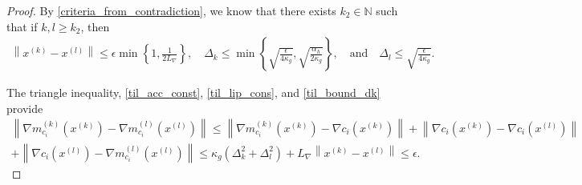 \documentclass{article}
\theoremstyle{case}
\numberwithin{theorem}{subsection}
\newcommand{\dk}{\Delta_k}
\newcommand{\dl}{\Delta_l}
\newcommand{\gk}{{\nabla m_f^{(k)}\left(\xk\right)}}
\newcommand{\gl}{{\nabla m_f^{(l)}\left(\xl\right)}}
\newcommand{\gmcik}{{\nabla m_{c_i}^{(k)}\left(\xk\right)}}
\newcommand{\gmcil}{{\nabla m_{c_i}^{(l)}\left(\xl\right)}}
\newcommand{\lipgrad}{{L_{\nabla}}}
\newcommand{\naturals}{\mathbb N}
\newcommand{\xk}{x^{(k)}}
\newcommand{\xl}{{x^{(l)}}}
\newcommand{\huffeps}{{\epsilon_h}}
\newcommand{\huffalpha}{{\alpha_h}}
\begin{document}
\begin{proof}
By \cref{criteria_from_contradiction}, we know that there exists $k_2 \in \naturals$ such that if $k, l \ge k_2$, then
\begin{align}
\label{til_bound_dk}
\left\|\xk - \xl \right\| \le \epsilon \min\left\{1, \frac{1}{2\lipgrad}\right\},
\quad
\dk \le \min\left\{
\sqrt{\frac{\epsilon}{4\kappa_g}},
\sqrt{\frac{\huffalpha}{2\kappa_g}}\right\},
\quad \textrm{and} \quad
\dl \le \sqrt{\frac{\epsilon}{4\kappa_g}}.
\end{align}


The triangle inequality, \cref{til_acc_const}, \cref{til_lip_cons}, and \cref{til_bound_dk} provide
\begin{align}
\left\| \gmcik - \gmcil \right\|
\le \left\| \gmcik - \nabla c_i\left(\xk\right) \right\|
+   \left\| \nabla c_i\left(\xk\right) - \nabla c_i\left(\xl\right) \right\| \nonumber \\
+   \left\| \nabla c_i\left(\xl\right) - \gmcil \right\|
\le \kappa_g \left(\dk^2 + \dl^2\right) + \lipgrad \left\|\xk - \xl\right\|  \le \epsilon. \label{til_gmc_close}
\end{align}





\end{proof}
\end{document}
